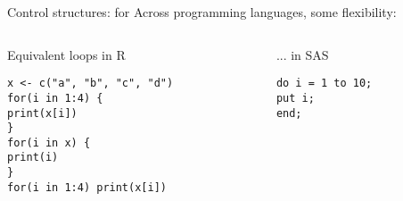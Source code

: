 \documentclass[xcolor=table,compress]{beamer}
\begin{document}
\begin{frame}[fragile]{Control structures: for}
Across programming languages, some flexibility:
\begin{columns}
\begin{column}[t]{.48\textwidth}
\pause
\begin{block}{Equivalent loops in R}
\begin{verbatim}
x <- c("a", "b", "c", "d")
for(i in 1:4) {
print(x[i])
}
for(i in x) {
print(i)
}
for(i in 1:4) print(x[i])
\end{verbatim}
\end{block}
\end{column}
\hfill
\begin{column}[t]{.48\textwidth}
\begin{block}{... in SAS}
\begin{verbatim}
do i = 1 to 10;
put i;
end;
\end{verbatim}
\end{block}
\end{column}

\end{columns}
\end{frame}
\end{document}
